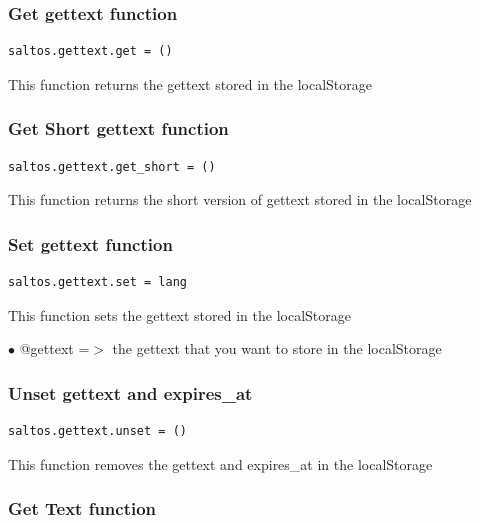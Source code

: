 \documentclass[a4paper]{article}
\begin{document}
\hypertarget{toc237}{}
\subsubsection{Get gettext function}

\begin{lstlisting}
saltos.gettext.get = ()
\end{lstlisting}

This function returns the gettext stored in the localStorage

\hypertarget{toc238}{}
\subsubsection{Get Short gettext function}

\begin{lstlisting}
saltos.gettext.get_short = ()
\end{lstlisting}

This function returns the short version of gettext stored in the localStorage

\hypertarget{toc239}{}
\subsubsection{Set gettext function}

\begin{lstlisting}
saltos.gettext.set = lang
\end{lstlisting}

This function sets the gettext stored in the localStorage

\begin{compactitem}
\item[\color{myblue}$\bullet$] @gettext      =$>$ the gettext that you want to store in the localStorage
\end{compactitem}

\hypertarget{toc240}{}
\subsubsection{Unset gettext and expires\_at}

\begin{lstlisting}
saltos.gettext.unset = ()
\end{lstlisting}

This function removes the gettext and expires\_at in the localStorage

\hypertarget{toc241}{}
\subsubsection{Get Text function}
\end{document}
